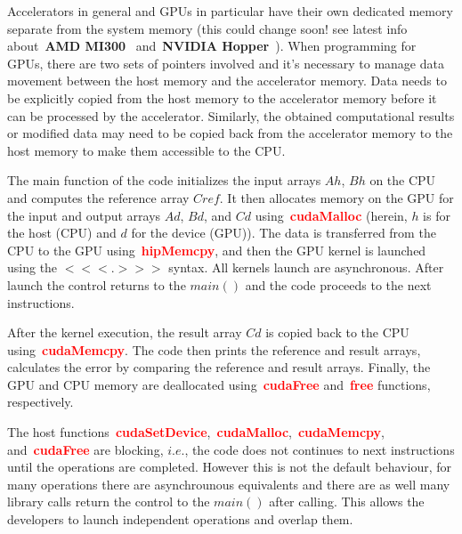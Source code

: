 \par
Accelerators in general and GPUs in particular have their own dedicated memory separate from the system memory (this could change soon! see latest info about~\textbf{AMD MI300}~\cite{amd_mi300} and~\textbf{NVIDIA Hopper}~\cite{nvidia_hopper}).
When programming for GPUs, there are two sets of pointers involved and it’s necessary to manage data movement between the host memory and the accelerator memory.
Data needs to be explicitly copied from the host memory to the accelerator memory before it can be processed by the accelerator.
Similarly, the obtained computational results or modified data may need to be copied back from the accelerator memory to the host memory to make them accessible to the CPU.


\par
The main function of the code initializes the input arrays $Ah$, $Bh$ on the CPU and computes the reference array $Cref$.
It then allocates memory on the GPU for the input and output arrays $Ad$, $Bd$, and $Cd$ using~\textbf{\textcolor{red}{cudaMalloc}} (herein, $h$ is for the host (CPU) and $d$ for the device (GPU)).
The data is transferred from the CPU to the GPU using~\textbf{\textcolor{red}{hipMemcpy}}, and then the GPU kernel is launched using the $<<<.>>>$ syntax.
All kernels launch are asynchronous.
After launch the control returns to the $main()$ and the code proceeds to the next instructions.


\par
After the kernel execution, the result array $Cd$ is copied back to the CPU using~\textbf{\textcolor{red}{cudaMemcpy}}.
The code then prints the reference and result arrays, calculates the error by comparing the reference and result arrays.
Finally, the GPU and CPU memory are deallocated using~\textbf{\textcolor{red}{cudaFree}} and~\textbf{\textcolor{red}{free}} functions, respectively.


\par
The host functions~\textbf{\textcolor{red}{cudaSetDevice}},~\textbf{\textcolor{red}{cudaMalloc}},~\textbf{\textcolor{red}{cudaMemcpy}}, and~\textbf{\textcolor{red}{cudaFree}} are blocking, $i.e.$, the code does not continues to next instructions until the operations are completed.
However this is not the default behaviour, for many operations there are asynchrounous equivalents and there are as well many library calls return the control to the $main()$ after calling. 
This allows the developers to launch independent operations and overlap them.


